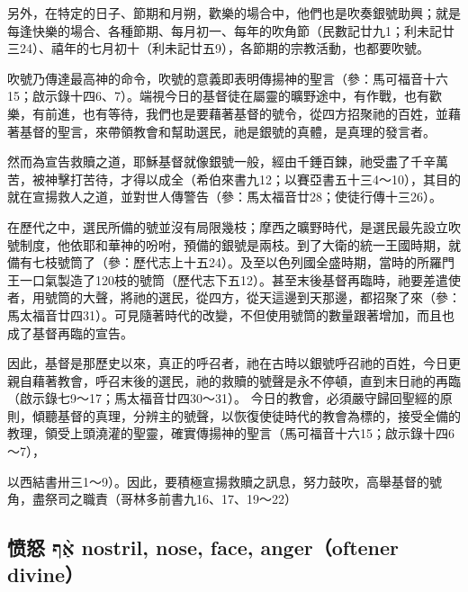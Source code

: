 另外，在特定的日子、節期和月朔，歡樂的場合中，他們也是吹奏銀號助興；就是每逢快樂的場合、各種節期、每月初一、每年的吹角節（民數記廿九1；利未記廿三24）、禧年的七月初十（利未記廿五9），各節期的宗教活動，也都要吹號。


吹號乃傳達最高神的命令，吹號的意義即表明傳揚神的聖言（參：馬可福音十六15；啟示錄十四6、7）。端視今日的基督徒在屬靈的曠野途中，有作戰，也有歡樂，有前進，也有等待，我們也是要藉著基督的號令，從四方招聚祂的百姓，並藉著基督的聖言，來帶領教會和幫助選民，祂是銀號的真體，是真理的發言者。

然而為宣告救贖之道，耶穌基督就像銀號一般，經由千錘百鍊，祂受盡了千辛萬苦，被神擊打苦待，才得以成全（希伯來書九12；以賽亞書五十三4～10），其目的就在宣揚救人之道，並對世人傳警告（參：馬太福音廿28；使徒行傳十三26）。


在歷代之中，選民所備的號並沒有局限幾枝；摩西之曠野時代，是選民最先設立吹號制度，他依耶和華神的吩咐，預備的銀號是兩枝。到了大衛的統一王國時期，就備有七枝號筒了（參：歷代志上十五24）。及至以色列國全盛時期，當時的所羅門王一口氣製造了120枝的號筒（歷代志下五12）。甚至末後基督再臨時，祂要差遣使者，用號筒的大聲，將祂的選民，從四方，從天這邊到天那邊，都招聚了來（參：馬太福音廿四31）。可見隨著時代的改變，不但使用號筒的數量跟著增加，而且也成了基督再臨的宣告。

因此，基督是那歷史以來，真正的呼召者，祂在古時以銀號呼召祂的百姓，今日更親自藉著教會，呼召末後的選民，祂的救贖的號聲是永不停頓，直到末日祂的再臨（啟示錄七9～17；馬太福音廿四30～31）。
今日的教會，必須嚴守歸回聖經的原則，傾聽基督的真理，分辨主的號聲，以恢復使徒時代的教會為標的，接受全備的教理，領受上頭澆灌的聖靈，確實傳揚神的聖言（馬可福音十六15；啟示錄十四6～7），

以西結書卅三1～9）。因此，要積極宣揚救贖之訊息，努力鼓吹，高舉基督的號角，盡祭司之職責（哥林多前書九16、17、19～22）











\subsection{愤怒 אַ֨ף  nostril, nose, face, anger（oftener divine）}

